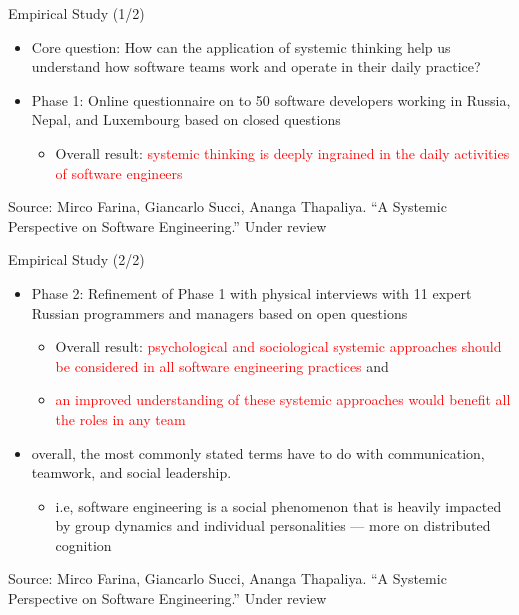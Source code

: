 \documentclass{beamer}
\begin{document}
\begin{frame}
{\centerline{Empirical Study (1/2)}}

\begin{itemize}
 \item Core question: How can the application of systemic thinking help us understand how software teams work and operate in their daily practice?
\item Phase 1: Online questionnaire on to 50 software developers working in Russia, Nepal, and Luxembourg based on closed questions
    \begin{itemize}
    \item Overall result: \textcolor{red}{systemic thinking is deeply ingrained in the daily activities of software engineers}
    \end{itemize}
\end{itemize}


\begin{center}
    \tiny{Source: Mirco Farina, Giancarlo Succi, Ananga Thapaliya. ``A Systemic Perspective on Software Engineering.'' Under review}
\end{center}

\end{frame}

\begin{frame}
{\centerline{Empirical Study (2/2)}}

\begin{itemize}
\item Phase 2: Refinement of Phase 1 with physical interviews with 11 expert Russian programmers and managers based on open questions
\begin{itemize}
    \item Overall result: \textcolor{red}{psychological and sociological systemic approaches should be considered in all software engineering practices} and 
    \item  \textcolor{red}{an improved understanding of these systemic approaches would benefit all the roles in any team}
    \end{itemize}
\item overall, the most commonly stated terms have to do with communication, teamwork, and social leadership. 
\begin{itemize}
\item i.e, software engineering is a social phenomenon that is heavily impacted by group dynamics and individual personalities --- more on distributed cognition
\end{itemize}
\end{itemize}


\begin{center}
    \tiny{Source: Mirco Farina, Giancarlo Succi, Ananga Thapaliya. ``A Systemic Perspective on Software Engineering.'' Under review}
\end{center}

\end{frame}
\end{document}
